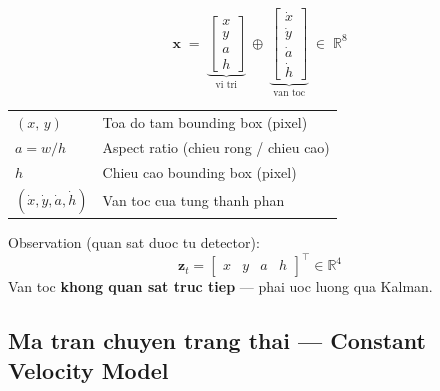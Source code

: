 \documentclass[12pt, a4paper]{article}
\newcommand{\vect}[1]{\bm{#1}}
\newcommand{\T}{^{\top}}
\begin{document}
\begin{definitionbox}
\[
  \vect{x} \;=\;
  \underbrace{\begin{bmatrix} x \\ y \\ a \\ h \end{bmatrix}}_{\text{vi tri}}
  \;\oplus\;
  \underbrace{\begin{bmatrix} \dot{x} \\ \dot{y} \\ \dot{a} \\ \dot{h} \end{bmatrix}}_{\text{van toc}}
  \;\in\; \mathbb{R}^{8}
\]
\smallskip
\begin{tabular}{@{}ll@{}}
  $(x,\, y)$        & Toa do tam bounding box (pixel) \\[2pt]
  $a = w/h$         & Aspect ratio (chieu rong / chieu cao) \\[2pt]
  $h$               & Chieu cao bounding box (pixel) \\[2pt]
  $(\dot{x}, \dot{y}, \dot{a}, \dot{h})$ & Van toc cua tung thanh phan \\
\end{tabular}
\end{definitionbox}

\medskip
Observation (quan sat duoc tu detector):
\[
  \vect{z}_t = \begin{bmatrix} x & y & a & h \end{bmatrix}\T \in \mathbb{R}^4
\]
Van toc \textbf{khong quan sat truc tiep} --- phai uoc luong qua Kalman.

\subsection{Ma tran chuyen trang thai --- Constant Velocity Model}
\end{document}

